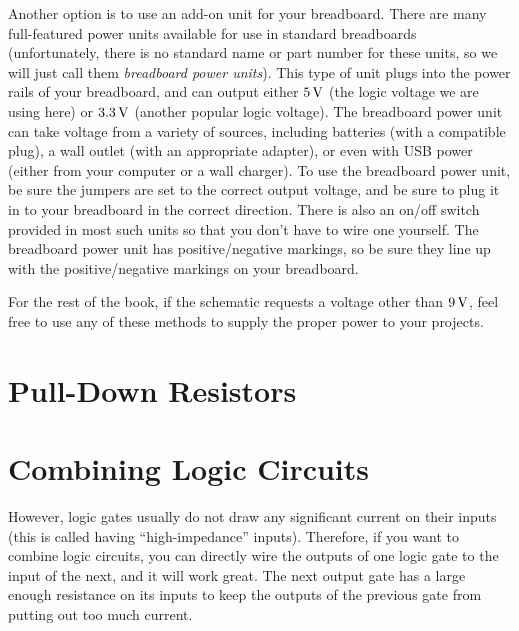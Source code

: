 Another option is to use an add-on unit for your breadboard.
There are many full-featured power units available for use in standard breadboards (unfortunately, there is no standard name or part number for these units, so we will just call them \emph{breadboard power units}).
This type of unit plugs into the power rails of your breadboard, and can output either $5\,\si{\volt}$ (the logic voltage we are using here) or $3.3\,\si{\volt}$ (another popular logic voltage).
The breadboard power unit can take voltage from a variety of sources, including batteries (with a compatible plug), a wall outlet (with an appropriate adapter), or even with USB power (either from your computer or a wall charger).
To use the breadboard power unit, be sure the jumpers are set to the correct output voltage, and be sure to plug it in to your breadboard in the correct direction.  
There is also an on/off switch provided in most such units so that you don't have to wire one yourself.
The breadboard power unit has positive/negative markings, so be sure they line up with the positive/negative markings on your breadboard.


For the rest of the book, if the schematic requests a voltage other than $9\,\si{\volt}$, feel free to use any of these methods to supply the proper power to your projects.

\section{Pull-Down Resistors}
\label{secPullDownResistors}

\section{Combining Logic Circuits}

However, logic gates usually do not draw any significant current on their inputs (this is called having ``high-impedance'' inputs). 
Therefore, if you want to combine logic circuits, you can directly wire the outputs of one logic gate to the input of the next, and it will work great.
The next output gate has a large enough resistance on its inputs to keep the outputs of the previous gate from putting out too much current.


